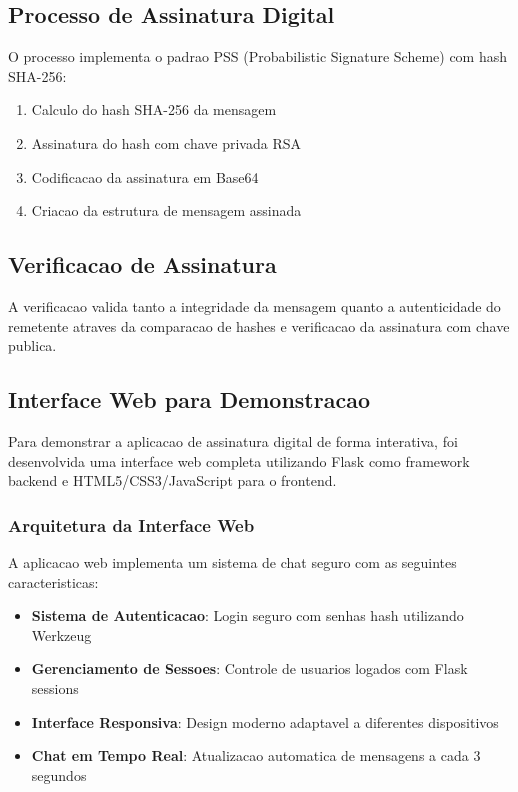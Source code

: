 \documentclass[12pt,a4paper,oneside]{article}
\begin{document}
\subsection{Processo de Assinatura Digital}

O processo implementa o padrao PSS (Probabilistic Signature Scheme) com hash SHA-256:

\begin{enumerate}
    \item Calculo do hash SHA-256 da mensagem
    \item Assinatura do hash com chave privada RSA
    \item Codificacao da assinatura em Base64
    \item Criacao da estrutura de mensagem assinada
\end{enumerate}

\subsection{Verificacao de Assinatura}

A verificacao valida tanto a integridade da mensagem quanto a autenticidade do remetente atraves da comparacao de hashes e verificacao da assinatura com chave publica.

\subsection{Interface Web para Demonstracao}

Para demonstrar a aplicacao de assinatura digital de forma interativa, foi desenvolvida uma interface web completa utilizando Flask como framework backend e HTML5/CSS3/JavaScript para o frontend.

\subsubsection{Arquitetura da Interface Web}

A aplicacao web implementa um sistema de chat seguro com as seguintes caracteristicas:

\begin{itemize}
    \item \textbf{Sistema de Autenticacao}: Login seguro com senhas hash utilizando Werkzeug
    \item \textbf{Gerenciamento de Sessoes}: Controle de usuarios logados com Flask sessions
    \item \textbf{Interface Responsiva}: Design moderno adaptavel a diferentes dispositivos
    \item \textbf{Chat em Tempo Real}: Atualizacao automatica de mensagens a cada 3 segundos
\end{itemize}
\end{document}
